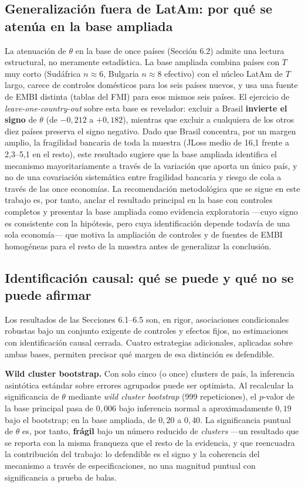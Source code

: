 \documentclass[5p,times,twocolumn,authoryear]{elsarticle}
\begin{document}
\subsection{Generalización fuera de LatAm: por qué se atenúa en la base ampliada}

La atenuación de $\theta$ en la base de once países (Sección 6.2) admite una lectura estructural, no meramente estadística. La base ampliada combina países con $T$ muy corto (Sudáfrica $n\approx6$, Bulgaria $n\approx8$ efectivo) con el núcleo LatAm de $T$ largo, carece de controles domésticos para los seis países nuevos, y usa una fuente de EMBI distinta (tablas del FMI) para esos mismos seis países. El ejercicio de \textit{leave-one-country-out} sobre esta base es revelador: excluir a Brasil \textbf{invierte el signo} de $\theta$ (de $-0{,}212$ a $+0{,}182$), mientras que excluir a cualquiera de los otros diez países preserva el signo negativo. Dado que Brasil concentra, por un margen amplio, la fragilidad bancaria de toda la muestra (JLoss medio de 16,1 frente a 2,3–5,1 en el resto), este resultado sugiere que la base ampliada identifica el mecanismo mayoritariamente a través de la variación que aporta un único país, y no de una covariación sistemática entre fragilidad bancaria y riesgo de cola a través de las once economías. La recomendación metodológica que se sigue en este trabajo es, por tanto, anclar el resultado principal en la base con controles completos y presentar la base ampliada como evidencia exploratoria —cuyo signo es consistente con la hipótesis, pero cuya identificación depende todavía de una sola economía— que motiva la ampliación de controles y de fuentes de EMBI homogéneas para el resto de la muestra antes de generalizar la conclusión.

\subsection{Identificación causal: qué se puede y qué no se puede afirmar}

Los resultados de las Secciones 6.1–6.5 son, en rigor, asociaciones condicionales robustas bajo un conjunto exigente de controles y efectos fijos, no estimaciones con identificación causal cerrada. Cuatro estrategias adicionales, aplicadas sobre ambas bases, permiten precisar qué margen de esa distinción es defendible.

\textbf{Wild cluster bootstrap.} Con solo cinco (o once) clusters de país, la inferencia asintótica estándar sobre errores agrupados puede ser optimista. Al recalcular la significancia de $\theta$ mediante \textit{wild cluster bootstrap} (999 repeticiones), el $p$-valor de la base principal pasa de $0{,}006$ bajo inferencia normal a aproximadamente $0{,}19$ bajo el bootstrap; en la base ampliada, de $0{,}20$ a $0{,}40$. La significancia puntual de $\theta$ es, por tanto, \textbf{frágil} bajo un número reducido de \textit{clusters} —un resultado que se reporta con la misma franqueza que el resto de la evidencia, y que reencuadra la contribución del trabajo: lo defendible es el signo y la coherencia del mecanismo a través de especificaciones, no una magnitud puntual con significancia a prueba de balas.
\end{document}
